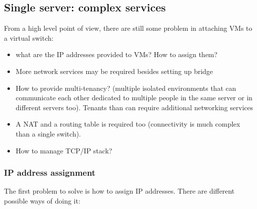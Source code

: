     
    \subsection{Single server: complex services}
        From a high level point of view, there are still some problem in attaching VMs to a virtual switch:
        \begin{itemize}
            \item what are the IP addresses provided to VMs? How to assign them?
            \item More network services may be required besides setting up bridge
            \item How to provide multi-tenancy? (multiple isolated environments that can communicate each other dedicated to multiple people in the same server or in different servers too). Tenants than can require additional networking services
            \item A NAT and a routing table is required too (connectivity is much complex than a single switch).
            \item How to manage TCP/IP stack?
        \end{itemize}

    \subsubsection{IP address assignment}
        The first problem to solve is how to assign IP addresses. There are different possible ways of doing it:
        

